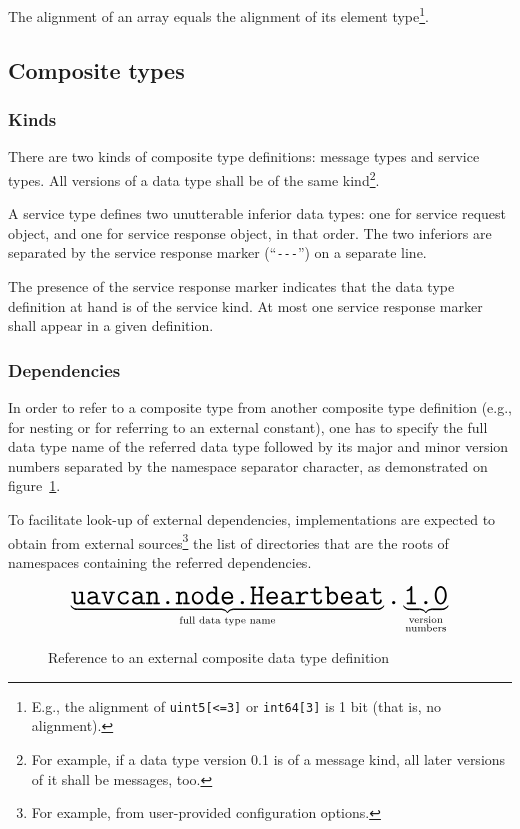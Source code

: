 The alignment of an array equals the alignment of its element type\footnote{
    E.g., the alignment of \texttt{uint5[<=3]} or \texttt{int64[3]} is 1 bit (that is, no alignment).
}.

\subsection{Composite types}\label{sec:dsdl_composite_types}

\subsubsection{Kinds}

There are two kinds of composite type definitions: message types and service types.
All versions of a data type shall be of the same kind\footnote{%
    For example, if a data type version 0.1 is of a message kind, all later versions of it shall be messages, too.
}.

A service type defines two unutterable inferior data types:
one for service request object, and one for service response object, in that order.
The two inferiors are separated by the service response marker (``\verb|---|'') on a separate line.

The presence of the service response marker indicates that the data type definition at hand is of the service kind.
At most one service response marker shall appear in a given definition.

\subsubsection{Dependencies}

In order to refer to a composite type from another composite type definition
(e.g., for nesting or for referring to an external constant),
one has to specify the full data type name of the referred data type followed by its
major and minor version numbers separated by the namespace separator character,
as demonstrated on figure~\ref{fig:dsdl_nested_reference}.

To facilitate look-up of external dependencies,
implementations are expected to obtain from external sources\footnote{%
    For example, from user-provided configuration options.
} the list of directories that are the roots of namespaces containing the referred dependencies.

\begin{figure}[H]
    $$
    \underbrace{\texttt{\huge{uavcan.node.Heartbeat}}}_{\text{full data type name}}%
    \texttt{\huge{.}}%
    \underbrace{\texttt{\huge{1.0}}}_{\substack{\text{version} \\ \text{numbers}}}%
    $$
    \caption{Reference to an external composite data type definition\label{fig:dsdl_nested_reference}}
\end{figure}

